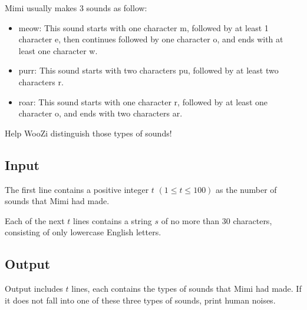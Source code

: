 \documentclass[12pt]{article}
\begin{document}
	Mimi usually makes 3 sounds as follow:
	
	
	\begin{itemize}
	
	\item {\selectfont meow}: This sound starts with one character {\selectfont m}, followed by at least 1 character {\selectfont e}, then continues followed by one character {\selectfont o}, and ends with at least one character {\selectfont w}.
	\item {\selectfont purr}: This sound starts with two characters {\selectfont pu}, followed by at least two characters {\selectfont r}.
	\item {\selectfont roar}: This sound starts with one character {\selectfont r}, followed by at least one character {\selectfont o}, and ends with two characters {\selectfont ar}.
	
	\end{itemize}
	
	Help WooZi distinguish those types of sounds!

	
	\subsection*{Input}
	
	The first line contains a positive integer $t$ $(1 \le t \le 100)$ as the number of sounds that Mimi had made.
	
	Each of the next $t$ lines contains a string $s$ of no more than $30$ characters, consisting of only lowercase English letters.
	
	\subsection*{Output}
	
	Output includes $t$ lines, each contains the types of sounds that Mimi had made. If it does not fall into one of these three types of sounds, print {\selectfont human noises}.	
	
\end{document}
